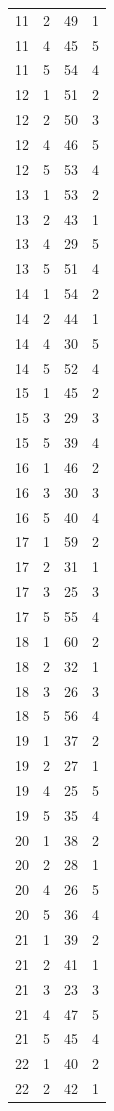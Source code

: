 \documentclass[a4paper, amsfonts, amssymb, amsmath, reprint, showkeys, nofootinbib, oneside]{revtex4-1}
\begin{document}
\begin{longtable}[h!]{ cccc }
	11 & 2 & 49 & 1 \\
	11 & 4 & 45 & 5 \\
	11 & 5 & 54 & 4 \\
	12 & 1 & 51 & 2 \\
	12 & 2 & 50 & 3 \\
	12 & 4 & 46 & 5 \\
	12 & 5 & 53 & 4 \\
	13 & 1 & 53 & 2 \\
	13 & 2 & 43 & 1 \\
	13 & 4 & 29 & 5 \\
	13 & 5 & 51 & 4 \\
	14 & 1 & 54 & 2 \\
	14 & 2 & 44 & 1 \\
	14 & 4 & 30 & 5 \\
	14 & 5 & 52 & 4 \\
	15 & 1 & 45 & 2 \\
	15 & 3 & 29 & 3 \\
	15 & 5 & 39 & 4 \\
	16 & 1 & 46 & 2 \\
	16 & 3 & 30 & 3 \\
	16 & 5 & 40 & 4 \\
	17 & 1 & 59 & 2 \\
	17 & 2 & 31 & 1 \\
	17 & 3 & 25 & 3 \\
	17 & 5 & 55 & 4 \\
	18 & 1 & 60 & 2 \\
	18 & 2 & 32 & 1 \\
	18 & 3 & 26 & 3 \\
	18 & 5 & 56 & 4 \\
	19 & 1 & 37 & 2 \\
	19 & 2 & 27 & 1 \\
	19 & 4 & 25 & 5 \\
	19 & 5 & 35 & 4 \\
	20 & 1 & 38 & 2 \\
	20 & 2 & 28 & 1 \\
	20 & 4 & 26 & 5 \\
	20 & 5 & 36 & 4 \\
	21 & 1 & 39 & 2 \\
	21 & 2 & 41 & 1 \\
	21 & 3 & 23 & 3 \\
	21 & 4 & 47 & 5 \\
	21 & 5 & 45 & 4 \\
	22 & 1 & 40 & 2 \\
	22 & 2 & 42 & 1 \\

\end{longtable}
\end{document}
